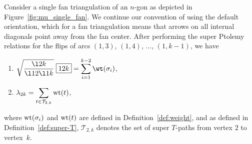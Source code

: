 \begin{Theorem} \label{thm:mu_single_fan}
 Consider a single fan triangulation of an $n$-gon as depicted in Figure~{\rm \ref{fig:mu_single_fan}}. We continue our convention of using the default orientation,
 which for a fan triangulation means that arrows on all internal diagonals point away from the fan center.
 After performing the super Ptolemy relations for the flips of arcs $(1,3)$, $(1,4)$, $\dots$, $(1,k-1)$, we have
 \begin{enumerate}\itemsep=0pt
 \item[$(a)$] $\displaystyle \sqrt{\frac{\l2k}{\l12\l1k}} \; \boxed{12k} = \sum_{i=1}^{k-2}\wt(\sigma_i)$,
 \item[$(b)$] $\displaystyle \lambda_{2k} = \sum_{t \in \mathcal{T}_{2,k}} {\rm wt}(t)$,
 \end{enumerate}
 where ${\rm wt}(\sigma_i)$ and ${\rm wt}(t)$ are defined in Definition~{\rm \ref{def:weight}}, and as defined in Definition~{\rm \ref{def:super-T}}, $\mathcal{T}_{2,k}$ denotes the set of super $T$-paths from vertex $2$ to vertex~$k$.
\end{Theorem}

